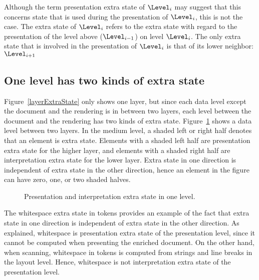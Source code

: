 \bc Although the term presentation extra state of $\Level_i$ may suggest that this concerns state that is used during the presentation of $\Level_i$, this is not the case. The extra state of $\Level_i$ refers to the extra state with regard to the presentation of the level above ($\Level_{i-1}$) on level $\Level_i$. The only extra state that is involved in the presentation of $\Level_i$ is that of its lower neighbor: $\Level_{i+1}$
\ec


%																
\subsection{One level has two kinds of extra state} \label{sect:oneLevelDoubleES}

Figure~\ref{layerExtraState} only shows one layer, but since each data level except the document and the rendering is in between two layers, each level between the document and the rendering has two kinds of extra state. Figure~\ref{levelExtraState} shows a data level between two layers. In the medium level, a shaded left or right half denotes that an element is extra state. Elements with a shaded left half are presentation extra state for the higher layer, and elements with a shaded right half are interpretation extra state for the lower layer. Extra state in one direction is independent of extra state in the other direction, hence an element in the figure can have zero, one, or two shaded halves.

\begin{figure}
\begin{center}
\begin{center}
\end{center}
\caption{Presentation and interpretation extra state in one level.}\label{levelExtraState} 
\end{center}
\end{figure}

The whitespace extra state in tokens provides an example of the fact that extra state in one direction is independent of extra state in the other direction. As explained, whitespace is presentation extra state of the presentation level, since it cannot be computed when presenting the enriched document. On the other hand, when scanning, whitespace in tokens is computed from strings and line breaks in the layout level. Hence, whitespace is not interpretation extra state of the presentation level.

